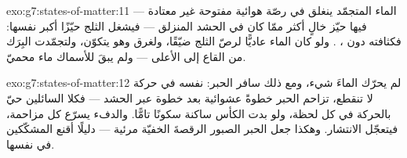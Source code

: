 \begin{solution}{exo:g7:states-of-matter:11}
الماء المتجمّد ينغلق في رصّة هوائية مفتوحة غير معتادة --- فيها
حيّز خالٍ أكثر ممّا كان في الحشد المنزلق --- فيشغل الثلج حيّزًا
أكبر  نفسها: فكثافته دون  ، . ولو كان
الماء عاديًّا لرصّ الثلج ضيّقًا، ولغرق وهو يتكوّن، ولتجمّدت
البِرَك من القاع إلى الأعلى --- ولم يبقَ للأسماك ماء محميّ.
\end{solution}

\begin{solution}{exo:g7:states-of-matter:12}
لم يحرّك الماءَ شيء، ومع ذلك سافر الحبر:   نفسه في
حركة لا تنقطع، تزاحم  الحبر خطوةً عشوائية بعد خطوة عبر
الحشد --- فكلا السائلين حيّ بالحركة في كل لحظة، ولو بدت الكأس
ساكنة سكونًا تامًّا. والدفء يسرّع كل مزاحمة، فيتعجّل الانتشار.
وهكذا جعل الحبر الصبور الرقصةَ الخفيّة مرئية --- دليلًا أقنع
المشكّكين في  نفسها.
\end{solution}

